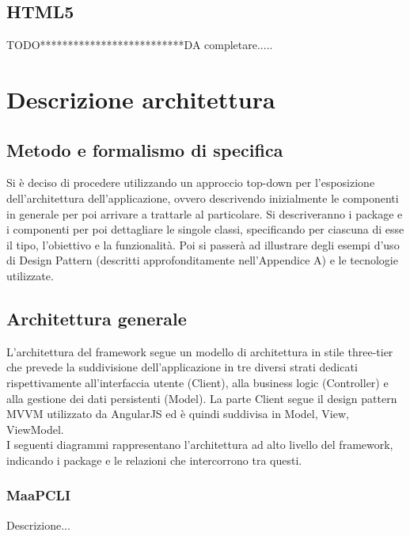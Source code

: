 \subsection{HTML5}
TODO**************************DA completare.....

\newpage
\section{Descrizione architettura}
\subsection{Metodo e formalismo di specifica}
Si è deciso di procedere utilizzando un approccio top-down per l'esposizione dell'architettura dell'applicazione, ovvero descrivendo inizialmente le componenti in generale per poi arrivare a trattarle al particolare.
Si descriveranno i package e i componenti per poi dettagliare le singole classi, specificando per ciascuna di esse il tipo, l'obiettivo e la funzionalità. Poi si passerà ad illustrare degli esempi d'uso di Design Pattern (descritti approfonditamente nell'Appendice A) e le tecnologie utilizzate.


\subsection{Architettura generale}
L'architettura del framework segue un modello di architettura in stile three-tier che prevede la suddivisione dell'applicazione  in tre diversi strati dedicati rispettivamente all'interfaccia utente (Client), alla business logic (Controller) e alla gestione dei dati persistenti (Model). La parte Client segue il design pattern MVVM utilizzato da AngularJS ed è quindi suddivisa in Model, View, ViewModel.\\

I seguenti diagrammi rappresentano l'architettura ad alto livello del framework, indicando i package e le relazioni che intercorrono tra questi.

\subsubsection{MaaPCLI}
Descrizione...

